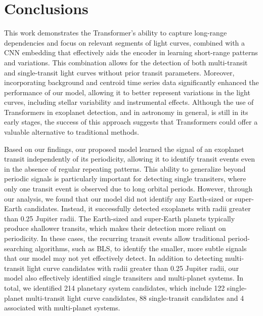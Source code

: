 
\section{Conclusions}
\label{sec:conclusions}

This work demonstrates the Transformer's ability to capture long-range dependencies and focus on relevant segments of light curves, combined with a CNN embedding that effectively aids the encoder in learning short-range patterns and variations. This combination allows for the detection of both multi-transit and single-transit light curves without prior transit parameters. Moreover, incorporating background and centroid time series data significantly enhanced the performance of our model, allowing it to better represent variations in the light curves, including stellar variability and instrumental effects. Although the use of Transformers in exoplanet detection, and in astronomy in general, is still in its early stages, the success of this approach suggests that Transformers could offer a valuable alternative to traditional methods.  \par



Based on our findings, our proposed model learned the signal of an exoplanet transit independently of its periodicity, allowing it to identify transit events even in the absence of regular repeating patterns. This ability to generalize beyond periodic signals is particularly important for detecting single transiters, where only one transit event is observed due to long orbital periods. However, through our analysis, we found that our model did not identify any Earth-sized or super-Earth candidates. Instead, it successfully detected exoplanets with radii greater than 0.25 Jupiter radii. The Earth-sized and super-Earth planets typically produce shallower transits, which makes their detection more reliant on periodicity. In these cases, the recurring transit events allow traditional period-searching algorithms, such as BLS, to identify the smaller, more subtle signals that our model may not yet effectively detect. In addition to detecting multi-transit light curve candidates with radii greater than 0.25 Jupiter radii, our model also effectively identified single transiters and multi-planet systems. In total, we identified 214 planetary system candidates, which include 122 single-planet multi-transit light curve candidates, 88 single-transit candidates and 4 associated with multi-planet systems. \par

